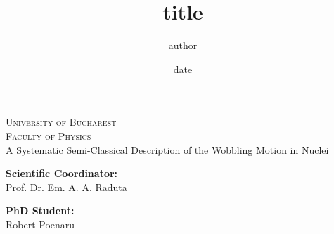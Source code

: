 \documentclass[12pt]{report}
\begin{document}
\title{title}
\author{author}
\date{date}

\begin{titlepage}
\begin{center}
    \textsc{ \LARGE{University of Bucharest \\}}
	\textsc{ \LARGE{Faculty of Physics\\ }}
	\vspace{30mm}
	\fontsize{9mm}{7mm}\selectfont 
    \textup{A Systematic Semi-Classical Description of the Wobbling Motion in Nuclei}
\end{center}

\vspace{25mm}

\begin{minipage}[t]{0.47\textwidth}
	\textnormal{\large{\bf Scientific Coordinator:\\}}
	{\large Prof. Dr. Em. A. A. Raduta}
\end{minipage}\hfill\begin{minipage}[t]{0.47\textwidth}\raggedleft
	\textnormal{\large{\bf PhD Student:\\}}
	{\large Robert Poenaru}
\end{minipage}

\vspace{40mm}


\vspace{30mm}

\centering{\large{\today}}
\end{titlepage}
\end{document}
